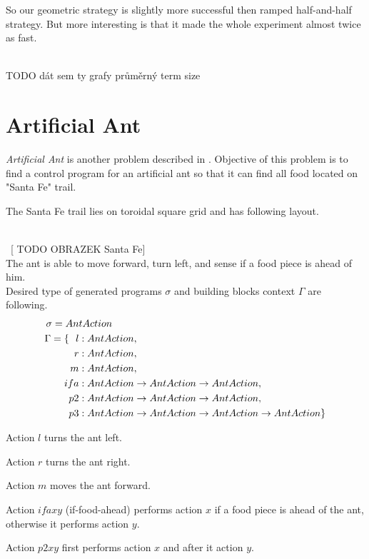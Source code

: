 \documentclass[12pt,a4paper]{report}
\begin{document}
So our geometric strategy is slightly more successful then 
ramped half-and-half strategy. But more interesting is that
it made the whole experiment almost twice as fast.

~\\TODO dát sem ty grafy průměrný term size 

\section{Artificial Ant}

\textit{Artificial Ant} is another problem described
in \cite{koza92}. Objective of this problem is to 
find a control program for an artificial ant so
that it can find all food located on "Santa Fe" trail.

The Santa Fe trail lies on toroidal square grid and has following layout.

~\\~[ TODO OBRAZEK Santa Fe]\\



The ant is able to move forward, turn left, and sense if a food 
piece is ahead of him.\\

Desired type of generated programs $\sigma$ and 
building blocks context $\Gamma$ are following.
\begin{align*}
\sigma = An&tAction\\
\Gamma = \{~~
  l    &: AntAction                              ,\\
  r    &: AntAction                              ,\\
  m    &: AntAction                              ,\\
  ifa  &: AntAction \rightarrow AntAction \rightarrow AntAction  ,\\
  p2   &: AntAction \rightarrow AntAction \rightarrow AntAction  ,\\
  p3   &: AntAction \rightarrow AntAction \rightarrow AntAction \rightarrow AntAction  \}
\end{align*}

Action $l$ turns the ant left.

Action $r$ turns the ant right.

Action $m$ moves the ant forward.

Action $ifa x y$ (if-food-ahead) performs action $x$ if a food piece is ahead of the ant,
otherwise it performs action $y$.

Action $p2 x y$ first performs action $x$ and after it action $y$.
\end{document}
